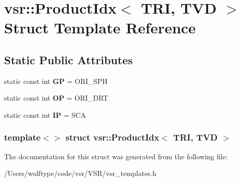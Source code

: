 \hypertarget{structvsr_1_1_product_idx_3_01_t_r_i_00_01_t_v_d_01_4}{\section{vsr\-:\-:Product\-Idx$<$ T\-R\-I, T\-V\-D $>$ Struct Template Reference}
\label{structvsr_1_1_product_idx_3_01_t_r_i_00_01_t_v_d_01_4}
}
\subsection*{Static Public Attributes}
\begin{DoxyCompactItemize}
\item 
\hypertarget{structvsr_1_1_product_idx_3_01_t_r_i_00_01_t_v_d_01_4_a6e49cba4d900feed0b911e94c2bc4d38}{static const int {\bfseries G\-P} = O\-R\-I\-\_\-\-S\-P\-H}\label{structvsr_1_1_product_idx_3_01_t_r_i_00_01_t_v_d_01_4_a6e49cba4d900feed0b911e94c2bc4d38}

\item 
\hypertarget{structvsr_1_1_product_idx_3_01_t_r_i_00_01_t_v_d_01_4_a4518be82b82d201be3425ec6cad1edcb}{static const int {\bfseries O\-P} = O\-R\-I\-\_\-\-D\-R\-T}\label{structvsr_1_1_product_idx_3_01_t_r_i_00_01_t_v_d_01_4_a4518be82b82d201be3425ec6cad1edcb}

\item 
\hypertarget{structvsr_1_1_product_idx_3_01_t_r_i_00_01_t_v_d_01_4_aba8d59143243114a01284725148d8e57}{static const int {\bfseries I\-P} = S\-C\-A}\label{structvsr_1_1_product_idx_3_01_t_r_i_00_01_t_v_d_01_4_aba8d59143243114a01284725148d8e57}

\end{DoxyCompactItemize}
\subsubsection*{template$<$$>$ struct vsr\-::\-Product\-Idx$<$ T\-R\-I, T\-V\-D $>$}



The documentation for this struct was generated from the following file\-:\begin{DoxyCompactItemize}
\item 
/\-Users/wolftype/code/vsr/\-V\-S\-R/vsr\-\_\-templates.\-h\end{DoxyCompactItemize}
